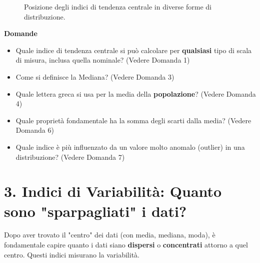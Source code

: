 \documentclass[12pt, a4paper]{article}
\newenvironment{reflectionbox}{%
    \medskip %
    \begin{framed}\par\noindent
    \textbf{\color{boxtitlecolor}Domande} \par
    \begin{itemize}[leftmargin=*, label=$\blacktriangleright$]
}{%
    \end{itemize}\par
    \end{framed}
    \medskip %
}
\begin{document}
\begin{figure}[ht]
\begin{tikzpicture}[scale=0.8, every node/.style={scale=0.8}]
\end{tikzpicture}
\caption{Posizione degli indici di tendenza centrale in diverse forme di distribuzione.}
\label{fig:distribuzioni}
\end{figure}

\clearpage %

\begin{reflectionbox}
    \item Quale indice di tendenza centrale si può calcolare per \textbf{qualsiasi} tipo di scala di misura, inclusa quella nominale? (Vedere Domanda 1)
    \item Come si definisce la Mediana? (Vedere Domanda 3)
    \item Quale lettera greca si usa per la media della \textbf{popolazione}? (Vedere Domanda 4)
    \item Quale proprietà fondamentale ha la somma degli scarti dalla media? (Vedere Domanda 6)
    \item Quale indice è più influenzato da un valore molto anomalo (outlier) in una distribuzione? (Vedere Domanda 7)
\end{reflectionbox}



\section*{3. Indici di Variabilità: Quanto sono "sparpagliati" i dati?}
Dopo aver trovato il "centro" dei dati (con media, mediana, moda), è fondamentale capire quanto i dati siano \textbf{dispersi} o \textbf{concentrati} attorno a quel centro. Questi indici misurano la variabilità.
\end{document}
